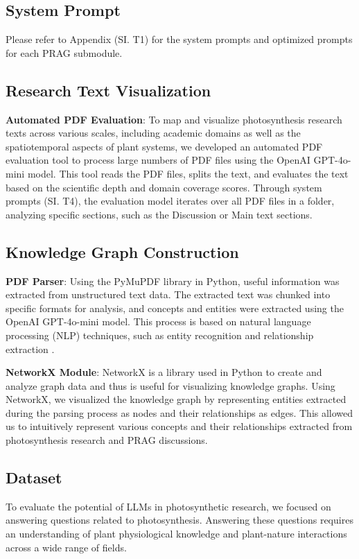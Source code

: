 \documentclass[12pt]{article}
\begin{document}
\subsection{System Prompt}
Please refer to Appendix (SI. T1) for the system prompts and optimized prompts for each PRAG submodule.

\subsection{Research Text Visualization}
\textbf{Automated PDF Evaluation}: To map and visualize photosynthesis research texts across various scales, including academic domains as well as the spatiotemporal aspects of plant systems, we developed an automated PDF evaluation tool to process large numbers of PDF files using the OpenAI GPT-4o-mini model. This tool reads the PDF files, splits the text, and evaluates the text based on the scientific depth and domain coverage scores. Through system prompts (SI. T4), the evaluation model iterates over all PDF files in a folder, analyzing specific sections, such as the Discussion or Main text sections.

\subsection{Knowledge Graph Construction}
\textbf{PDF Parser}: Using the PyMuPDF library in Python, useful information was extracted from unstructured text data. The extracted text was chunked into specific formats for analysis, and concepts and entities were extracted using the OpenAI GPT-4o-mini model. This process is based on natural language processing (NLP) techniques, such as entity recognition and relationship extraction \cite{ref26}.

\textbf{NetworkX Module}: NetworkX is a library used in Python to create and analyze graph data and thus is useful for visualizing knowledge graphs. Using NetworkX, we visualized the knowledge graph by representing entities extracted during the parsing process as nodes and their relationships as edges. This allowed us to intuitively represent various concepts and their relationships extracted from photosynthesis research and PRAG discussions.

\subsection{Dataset}
To evaluate the potential of LLMs in photosynthetic research, we focused on answering questions related to photosynthesis. Answering these questions requires an understanding of plant physiological knowledge and plant-nature interactions across a wide range of fields.
\end{document}
